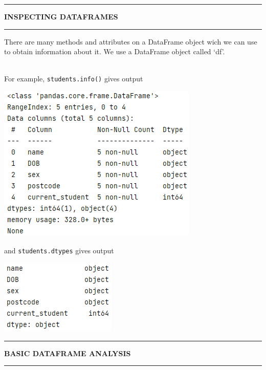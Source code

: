 \documentclass[8pt]{extarticle}
\newcommand{\heading}[1]{%
    \noindent
    \rule{\linewidth}{0.4pt}
    \begin{center}
        \vspace{-1ex}
        \textbf{#1}        
        \vspace{-2.5ex}
    \end{center}
    \rule{\linewidth}{0.4pt}
}
\begin{document}
\begin{multicols}{4}
\heading{INSPECTING DATAFRAMES}

There are many methods and attributes on a DataFrame object wich we can use to obtain information about it. We use a DataFrame object called `df'.\\

\\

\columnbreak

For example, \lstinline[style=Python]!students.info()! gives output
\begin{center}
\includegraphics[scale = 0.6]{images/info()_method.png}
\end{center}
and \lstinline[style=Python]!students.dtypes! gives output
\begin{center}
\includegraphics[scale = 0.6]{images/dtypes.png}
\end{center}
\heading{BASIC DATAFRAME ANALYSIS}


\end{multicols}
\end{document}
